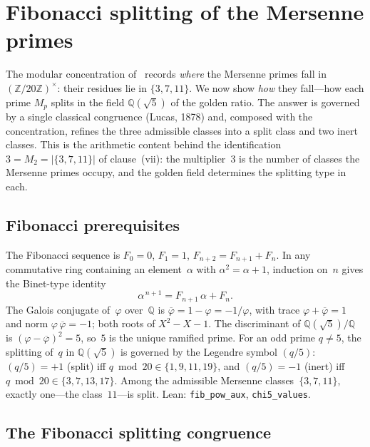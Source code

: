 \documentclass[11pt]{amsart}
\theoremstyle{definition}
\newcommand{\golden}{\varphi}
\newcommand{\Mp}{M_{p}}
\newcommand{\Ztwenty}{(\mathbb{Z}/20\mathbb{Z})^{\times}}
\newcommand{\lean}[1]{\texttt{#1}}
\begin{document}
\section{Fibonacci splitting of the Mersenne primes}
\label{sec:fibonacci}

The modular concentration of~ records
\emph{where} the Mersenne primes fall in $\Ztwenty$: their residues lie
in $\{3,7,11\}$.  We now show \emph{how} they fall---how each prime
$\Mp$ splits in the field $\mathbb{Q}(\sqrt5)$ of the golden ratio.  The
answer is governed by a single classical congruence (Lucas, 1878) and,
composed with the concentration, refines the three admissible classes
into a split class and two inert classes.  This is the arithmetic
content behind the identification $3=M_{2}=|\{3,7,11\}|$ of
clause~(vii): the multiplier~$3$ is the number of classes the Mersenne
primes occupy, and the golden field determines the splitting type in
each.

\subsection{Fibonacci prerequisites}
\label{ssec:fib-prereq}

The Fibonacci sequence is $F_{0}=0$, $F_{1}=1$, $F_{n+2}=F_{n+1}+F_{n}$.
In any commutative ring containing an element~$\alpha$ with
$\alpha^{2}=\alpha+1$, induction on~$n$ gives the Binet-type identity
\begin{equation}\label{eq:binet}
  \alpha^{\,n+1} = F_{n+1}\,\alpha + F_{n}.
\end{equation}
The Galois conjugate of~$\golden$ over~$\mathbb{Q}$ is
$\overline{\golden}=1-\golden=-1/\golden$, with trace
$\golden+\overline{\golden}=1$ and norm
$\golden\,\overline{\golden}=-1$; both roots of $X^{2}-X-1$.  The
discriminant of $\mathbb{Q}(\sqrt5)/\mathbb{Q}$ is
$(\golden-\overline{\golden})^{2}=5$, so~$5$ is the unique ramified
prime.  For an odd prime $q\neq5$, the splitting of~$q$ in
$\mathbb{Q}(\sqrt5)$ is governed by the Legendre symbol $(q/5)$:
$(q/5)=+1$ (split) iff $q\bmod 20\in\{1,9,11,19\}$, and $(q/5)=-1$
(inert) iff $q\bmod 20\in\{3,7,13,17\}$.  Among the admissible Mersenne
classes~$\{3,7,11\}$, exactly one---the class~$11$---is split.
Lean: \lean{fib\_pow\_aux}, \lean{chi5\_values}.

\subsection{The Fibonacci splitting congruence}
\label{ssec:fib-congruence}
\end{document}

